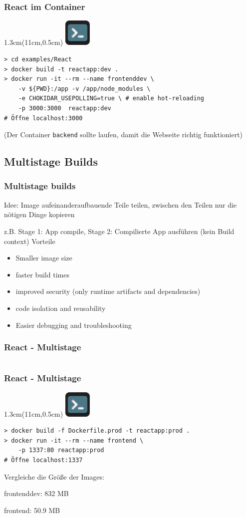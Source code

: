 \documentclass[22pt]{beamer}
\newcommand{\code}[1]{\colorbox{gray!10}{\texttt{#1}}}
\newcommand{\terminal}{
    \begin{textblock*}{1.3cm}(11cm,0.5cm) %
    \includegraphics[width=1.3cm]{Bilder/terminal2.png}
    \end{textblock*}
}
\begin{document}
\begin{frame}[fragile]
    \frametitle{React im Container}
    \terminal
\begin{verbatim}
> cd examples/React
> docker build -t reactapp:dev .
> docker run -it --rm --name frontenddev \
    -v ${PWD}:/app -v /app/node_modules \
    -e CHOKIDAR_USEPOLLING=true \ # enable hot-reloading
    -p 3000:3000  reactapp:dev
# Öffne localhost:3000

\end{verbatim}
\footnotesize (Der Container \code{backend} sollte laufen, damit die Webseite richtig funktioniert)
\end{frame}

\subsection{Multistage Builds}
\begin{frame}[t]
    \frametitle{Multistage builds}
    Idee: Image aufeinanderaufbauende Teile teilen, zwischen den Teilen nur die nötigen Dinge kopieren

    z.B. Stage 1: App compile, Stage 2: Compilierte App ausführen (kein Build context) 
    \pause
    Vorteile
    \begin{itemize}
        \item Smaller image size
        \item faster build times
        \item improved security (only runtime artifacts and dependencies)
        \item code isolation and reusability
        \item Easier debugging and troubleshooting
    \end{itemize} 
\end{frame}

\begin{frame}[fragile]
    \frametitle{React - Multistage}
    \inputminted[fontsize=\footnotesize, frame=lines]{dockerfile}{../examples/React/Dockerfile.prod}
\end{frame}

\begin{frame}[fragile]
    \frametitle{React - Multistage}
    \terminal
\begin{verbatim}
> docker build -f Dockerfile.prod -t reactapp:prod .
> docker run -it --rm --name frontend \
    -p 1337:80 reactapp:prod
# Öffne localhost:1337
\end{verbatim}
\vspace{8pt}
Vergleiche die Größe der Images:\pause

frontenddev: 832 MB

frontend: 50.9 MB

\end{frame}
\end{document}
